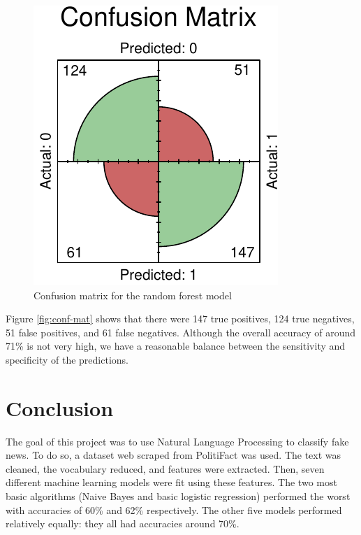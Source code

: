 \documentclass[12pt]{article}
\begin{document}
\begin{figure}[H]

{\centering \includegraphics{report_files/figure-latex/unnamed-chunk-7-1} 

}

\caption{\label{fig:conf-mat}Confusion matrix for the random forest model}\label{fig:unnamed-chunk-7}
\end{figure}

Figure \ref{fig:conf-mat} shows that there were 147 true positives, 124
true negatives, 51 false positives, and 61 false negatives. Although the
overall accuracy of around 71\% is not very high, we have a reasonable
balance between the sensitivity and specificity of the predictions.

\newpage

\hypertarget{conclusion}{%
\section{Conclusion}\label{conclusion}}

The goal of this project was to use Natural Language Processing to
classify fake news. To do so, a dataset web scraped from PolitiFact was
used. The text was cleaned, the vocabulary reduced, and features were
extracted. Then, seven different machine learning models were fit using
these features. The two most basic algorithms (Naive Bayes and basic
logistic regression) performed the worst with accuracies of 60\% and
62\% respectively. The other five models performed relatively equally:
they all had accuracies around 70\%.
\end{document}
